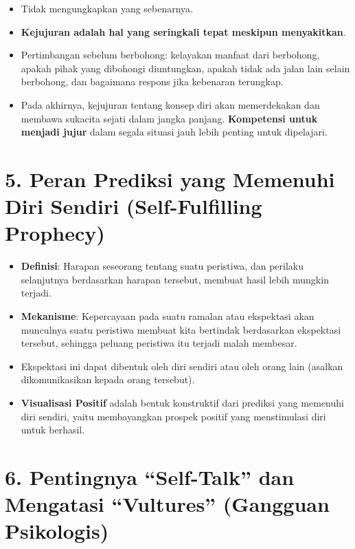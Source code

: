 \documentclass[
  letterpaper,
  DIV=11,
  numbers=noendperiod]{scrreprt}
\providecommand{\tightlist}{%
  \setlength{\itemsep}{0pt}\setlength{\parskip}{0pt}}
\begin{document}
\begin{itemize}
  \begin{itemize}
  \tightlist
  \item
    Tidak mengungkapkan yang sebenarnya.
  \item
    \textbf{Kejujuran adalah hal yang seringkali tepat meskipun
    menyakitkan}.
  \item
    Pertimbangan sebelum berbohong: kelayakan manfaat dari berbohong,
    apakah pihak yang dibohongi diuntungkan, apakah tidak ada jalan lain
    selain berbohong, dan bagaimana respons jika kebenaran terungkap.
  \item
    Pada akhirnya, kejujuran tentang konsep diri akan memerdekakan dan
    membawa sukacita sejati dalam jangka panjang. \textbf{Kompetensi
    untuk menjadi jujur} dalam segala situasi jauh lebih penting untuk
    dipelajari.
  \end{itemize}
\end{itemize}

\section{5. Peran Prediksi yang Memenuhi Diri Sendiri (Self-Fulfilling
Prophecy)}\label{peran-prediksi-yang-memenuhi-diri-sendiri-self-fulfilling-prophecy}

\begin{itemize}
\tightlist
\item
  \textbf{Definisi}: Harapan seseorang tentang suatu peristiwa, dan
  perilaku selanjutnya berdasarkan harapan tersebut, membuat hasil lebih
  mungkin terjadi.
\item
  \textbf{Mekanisme}: Kepercayaan pada suatu ramalan atau ekspektasi
  akan munculnya suatu peristiwa membuat kita bertindak berdasarkan
  ekspektasi tersebut, sehingga peluang peristiwa itu terjadi malah
  membesar.
\item
  Ekspektasi ini dapat dibentuk oleh diri sendiri atau oleh orang lain
  (asalkan dikomunikasikan kepada orang tersebut).
\item
  \textbf{Visualisasi Positif} adalah bentuk konstruktif dari prediksi
  yang memenuhi diri sendiri, yaitu membayangkan prospek positif yang
  menstimulasi diri untuk berhasil.
\end{itemize}

\section{6. Pentingnya ``Self-Talk'' dan Mengatasi ``Vultures''
(Gangguan
Psikologis)}\label{pentingnya-self-talk-dan-mengatasi-vultures-gangguan-psikologis}
\end{document}
